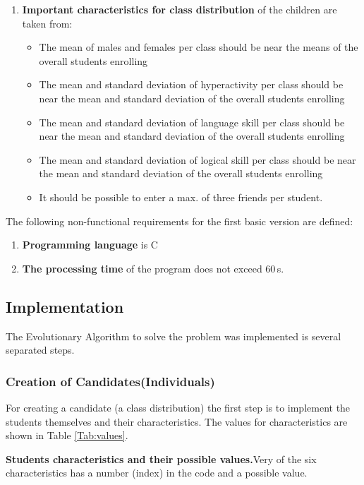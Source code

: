 \begin{onehalfspace}
\begin{enumerate}
  \item \textbf{Important characteristics for class distribution} of the children are taken from:
  
   \begin{itemize}
        \item The mean of males and females per class should be near the means of the overall students enrolling
        \item The mean and standard deviation of hyperactivity per class should be near the mean and standard deviation  of the overall students enrolling
        \item The mean and standard deviation  of language skill per class should be near the mean and standard deviation  of the overall students enrolling
        \item The mean and standard deviation  of logical skill per class should be near the mean and standard deviation  of the overall students enrolling
        \item It should be possible to enter a max. of three friends per student. 
    \end{itemize}
\end{enumerate}

The following non-functional requirements for the first basic version are defined:

\begin{enumerate}
  \item \textbf{Programming language} is C
  \item \textbf{The processing time} of the program does not exceed 60\,s.
\end{enumerate}


\subsection{Implementation}
The Evolutionary Algorithm to solve the problem was implemented is several separated steps.
\subsubsection{Creation of Candidates(Individuals)}
For creating a candidate (a class distribution) 
the first step is to implement the students themselves 
and their characteristics. The values for characteristics 
are shown in Table \ref{Tab:values}.


\begin{table} [H]
    \centering
    \caption[Students characteristics and their possible values.]{\textbf{Students characteristics and their possible values.}Very of the six characteristics has a number (index) in the code and a possible value.}


\end{table}
\end{onehalfspace}
